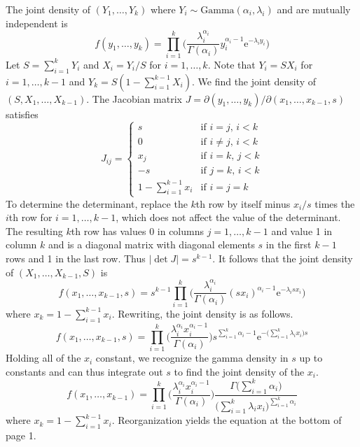 The joint density of $(Y_1,\ldots,Y_k)$ where $Y_i \sim \text{Gamma}(\alpha_i,\lambda_i)$ and are mutually independent is
$$
f(y_1,\ldots,y_k) = \prod_{i=1}^k \Bigg( \frac{ \lambda_i^{\alpha_i}}{\Gamma(\alpha_i)} y_i^{\alpha_i-1} \mathrm{e}^{-\lambda_i y_i} \Bigg)
$$
Let $S = \sum_{i=1}^k Y_i$ and $X_i = Y_i / S$ for $i=1,\ldots,k$.
Note that $Y_i = SX_i$ for $i=1,\ldots,k-1$ and $Y_k = S(1 - \sum_{i=1}^{k-1} X_i)$.
We find the joint density of $(S,X_1,\ldots,X_{k-1})$.
The Jacobian matrix $J = \partial(y_1,\ldots,y_k)/\partial(x_1,\ldots,x_{k-1},s)$
satisfies
$$
J_{ij} = \left\{
\begin{array}{ll}
s & \text{if $i=j$, $i<k$} \\
0 & \text{if $i \neq j$, $i<k$} \\
x_j & \text{if $i=k$, $j<k$} \\
-s & \text{if $j=k$, $i<k$} \\
1 - \sum_{i=1}^{k-1} x_i & \text{if $i=j=k$}
\end{array}
\right.
$$
To determine the determinant,
replace the $k$th row by itself minus $x_i/s$ times the $i$th row
for $i=1,\ldots,k-1$,
which does not affect the value of the determinant.
The resulting $k$th row has values 0 in columns $j=1,\ldots,k-1$ and value 1
in column $k$ and is a diagonal matrix with diagonal elements $s$ in the first $k-1$ rows and 1 in the last row.
Thus $|\det J| = s^{k-1}$.
It follows that the joint density of $(X_1,\ldots,X_{k-1},S)$ is
$$
f(x_1,\ldots,x_{k-1},s) = s^{k-1} \prod_{i=1}^k \Bigg( \frac{ \lambda_i^{\alpha_i}}{\Gamma(\alpha_i)} (sx_i)^{\alpha_i-1} \mathrm{e}^{-\lambda_i sx_i} \Bigg)
$$
where $x_k = 1 - \sum_{i=1}^{k-1} x_i$.
Rewriting, the joint density is as follows.
$$
f(x_1,\ldots,x_{k-1},s) =  \prod_{i=1}^k \Bigg( \frac{ \lambda_i^{\alpha_i}x_i^{\alpha_i-1}}{\Gamma(\alpha_i)} \Bigg)
s^{\sum_{i=1}^k \alpha_i-1} \mathrm{e}^{-\big(\sum_{i=1}^k \lambda_ix_i\big)s}
$$
Holding all of the $x_i$ constant,
we recognize the gamma density in $s$
up to constants and can thus integrate out $s$ to find the joint density of the $x_i$.
$$
f(x_1,\ldots,x_{k-1}) = \prod_{i=1}^k \Bigg( \frac{ \lambda_i^{\alpha_i}x_i^{\alpha_i-1}}{\Gamma(\alpha_i)} \Bigg) \frac{\Gamma\big(\sum_{i=1}^k \alpha_i\big)}{\big(\sum_{i=1}^k \lambda_i x_i\big)^{\sum_{i=1}^k \alpha_i}}
$$
where $x_k = 1 - \sum_{i=1}^{k-1} x_i$.
Reorganization yields the equation at the bottom of page 1.